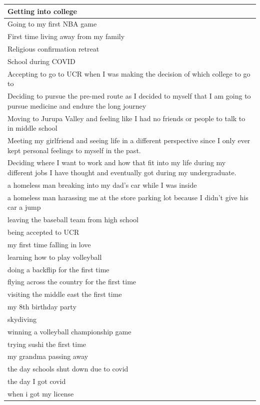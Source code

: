 \documentclass[
  .7em,
  letterpaper,
  DIV=11,
  numbers=noendperiod]{scrartcl}
\begin{document}
\begin{table}
\begin{tabular}{l}
\hline
Getting into college\\
\hline
Going to my first NBA game\\
\hline
First time living away from my family\\
\hline
Religious confirmation retreat\\
\hline
School during COVID\\
\hline
Accepting to go to UCR when I was making the decision of which college to go to\\
\hline
Deciding to pursue the pre-med route as I decided to myself that I am going to pursue medicine and endure the long journey\\
\hline
Moving to Jurupa Valley and feeling like I had no friends or people to talk to in middle school\\
\hline
Meeting my girlfriend and seeing life in a different perspective since I only ever kept personal feelings to myself in the past.\\
\hline
Deciding where I want to work and how that fit into my life during my different jobs I have thought and eventually got during my undergraduate.\\
\hline
a homeless man breaking into my dad's car while I was inside\\
\hline
a homeless man harassing me at the store parking lot because I didn't give his car a jump\\
\hline
leaving the baseball team from high school\\
\hline
being accepted to UCR\\
\hline
my first time falling in love\\
\hline
learning how to play volleyball\\
\hline
doing a backflip for the first time\\
\hline
flying across the country for the first time\\
\hline
visiting the middle east the first time\\
\hline
my 8th birthday party\\
\hline
skydiving\\
\hline
winning a volleyball championship game\\
\hline
trying sushi the first time\\
\hline
my grandma passing away\\
\hline
the day schools shut down due to covid\\
\hline
the day I got covid\\
\hline
when i got my license\\

\end{tabular}
\end{table}
\end{document}
